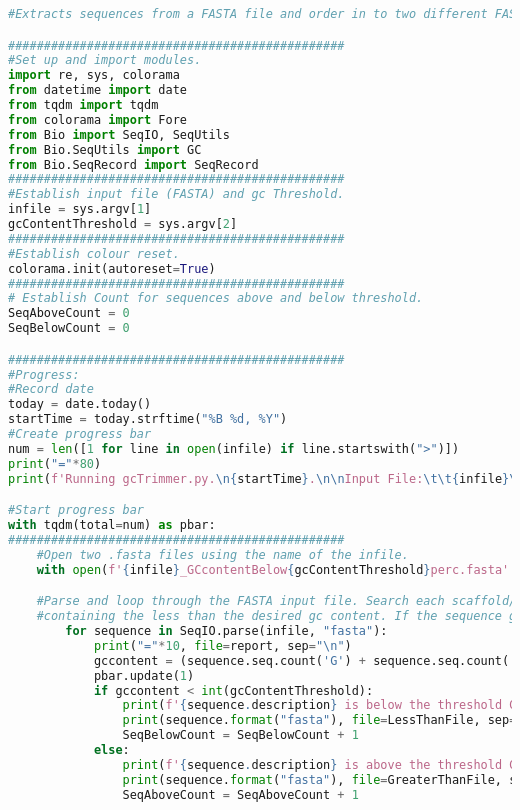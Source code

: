 \begin{lstlisting}[language=Python, caption=Script to separate contigs based on GC\% threshold]
#Extracts sequences from a FASTA file and order in to two different FASTAs depending on GC content

###############################################
#Set up and import modules.
import re, sys, colorama
from datetime import date
from tqdm import tqdm
from colorama import Fore
from Bio import SeqIO, SeqUtils
from Bio.SeqUtils import GC
from Bio.SeqRecord import SeqRecord
###############################################
#Establish input file (FASTA) and gc Threshold.
infile = sys.argv[1]
gcContentThreshold = sys.argv[2]
###############################################
#Establish colour reset.
colorama.init(autoreset=True)
###############################################
# Establish Count for sequences above and below threshold.
SeqAboveCount = 0
SeqBelowCount = 0

###############################################
#Progress:
#Record date
today = date.today()
startTime = today.strftime("%B %d, %Y")
#Create progress bar
num = len([1 for line in open(infile) if line.startswith(">")])
print("="*80)
print(f'Running gcTrimmer.py.\n{startTime}.\n\nInput File:\t\t{infile}\nNumber of Contigs:\t{num}\nGC threshold:\t\t{gcContentThreshold}%\n')

#Start progress bar
with tqdm(total=num) as pbar:
###############################################
    #Open two .fasta files using the name of the infile.
    with open(f'{infile}_GCcontentBelow{gcContentThreshold}perc.fasta'.format(), "a") as LessThanFile, open(f'{infile}_GCcontentAbove{gcContentThreshold}perc.fasta'.format(), "a") as GreaterThanFile, open(f'gcContentReport.txt'.format(), "a") as report  :

    #Parse and loop through the FASTA input file. Search each scaffold/contig for sequences with length => than the desired GC content and deposit them in the FASTA
    #containing the less than the desired gc content. If the sequence gc content is greater than the gc content threshold, then it is added to the "greater than" FASTA file.
        for sequence in SeqIO.parse(infile, "fasta"):
            print("="*10, file=report, sep="\n")
            gccontent = (sequence.seq.count('G') + sequence.seq.count('C')) / len(sequence) * 100
            pbar.update(1)
            if gccontent < int(gcContentThreshold):
                print(f'{sequence.description} is below the threshold GC content. GC content is {Fore.RED}{gccontent}{Fore.BLACK}.\n', file=report, sep="\n")
                print(sequence.format("fasta"), file=LessThanFile, sep="\n")
                SeqBelowCount = SeqBelowCount + 1
            else:
                print(f'{sequence.description} is above the threshold GC content. GC content is {Fore.GREEN}{gccontent}{Fore.BLACK}.\n', file=report, sep="\n")
                print(sequence.format("fasta"), file=GreaterThanFile, sep="\n")
                SeqAboveCount = SeqAboveCount + 1



\end{lstlisting}
